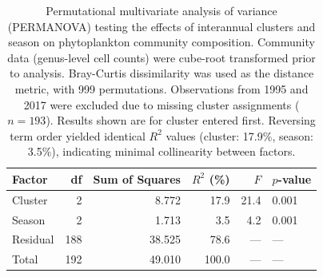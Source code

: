 \documentclass{agujournal2019}
\begin{document}
\begin{table}[ht]
\centering
\caption{Permutational multivariate analysis of variance (PERMANOVA) testing the effects of interannual clusters and season on phytoplankton community composition. Community data (genus-level cell counts) were cube-root transformed prior to analysis. Bray-Curtis dissimilarity was used as the distance metric, with 999 permutations. Observations from 1995 and 2017 were excluded due to missing cluster assignments ($n = 193$). Results shown are for cluster entered first. Reversing term order yielded identical $R^{2}$ values (cluster: 17.9\%, season: 3.5\%), indicating minimal collinearity between factors.}
\label{tab:sup:permanova_season_cluster}
\begin{tabular}{l r r r r l}
\hline
Factor & df & Sum of Squares & $R^{2}$ (\%) & $F$ & $p$-value \\
\hline
Cluster & 2 & 8.772 & 17.9 & 21.4 & 0.001 \\
Season & 2 & 1.713 & 3.5 & 4.2 & 0.001 \\
Residual & 188 & 38.525 & 78.6 & --- & --- \\
Total & 192 & 49.010 & 100.0 & --- & --- \\
\hline
\end{tabular}
\end{table}

\clearpage
\end{document}
